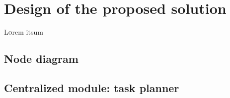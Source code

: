 \chapter{Design of the proposed solution}
\label{ch:DesignOfTheProposedSolution}
\lettrine[lraise=-0.1, lines=2, loversize=0.2]{L}{o}rem itsum


\section{Node diagram}
\label{sec:NodeDiagram}

\section{Centralized module: task planner}
\label{sec:Centralized module:TaskPlanner}

